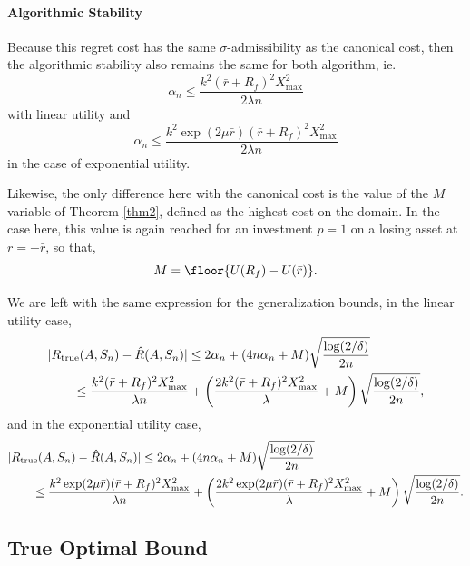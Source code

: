 \paragraph{Algorithmic Stability}
  Because this regret cost has the same $\sigma$-admissibility as the canonical cost, then
  the algorithmic stability also remains the same for both algorithm, ie.
  \begin{equation*}
    \alpha_n \leq \frac{k^2(\bar r+R_f)^2X^2_{\max}}{2\lambda n}
  \end{equation*}
  with linear utility and
  \begin{equation*}
    \alpha_n \leq \frac{k^2 \exp(2\mu\bar r)(\bar r + R_f)^2 X^2_{\max}}{2\lambda n}
  \end{equation*}
  in the case of exponential utility.


\begin{rem}
  Likewise, the only difference here with the canonical cost is the value of the $M$
  variable of Theorem \ref{thm2}, defined as the highest cost on the domain. In the case
  here, this value is again reached for an investment $p=1$ on a losing asset at $r=-\bar
  r$, so that,
  \begin{equation*}
    M = \floor{U(R_f) - U(\bar r)}.
  \end{equation*}

  We are left with the same expression for the generalization bounds, in the linear
  utility case,
  \begin{align*}
    &|R_{\mathrm{true}}(A,S_n) - \hat{R}(A,S_n)| \leq 2\alpha_n + (4n\alpha_n +
      M)\sqrt{\frac{\log(2/\delta)}{2n}}\\
    &\qquad \leq \frac{k^2(\bar r+R_f)^2X^2_{\max}}{\lambda n} + \left(\frac{2k^2(\bar r+R_f)^2X^2_{\max}}{\lambda} + M\right)\sqrt{\frac{\log(2/\delta)}{2n}},
  \end{align*}
  and in the exponential utility case, 
  \begin{align*}
    &|R_{\mathrm{true}}(A,S_n) - \hat{R}(A,S_n)| \leq 2\alpha_n + (4n\alpha_n +
      M)\sqrt{\frac{\log(2/\delta)}{2n}}\\
    &\qquad \leq \frac{k^2 \exp(2\mu\bar r)(\bar r + R_f)^2 X^2_{\max}}{\lambda n} + \left(\frac{2k^2 \exp(2\mu\bar r)(\bar r + R_f)^2 X^2_{\max}}{\lambda} + M\right)\sqrt{\frac{\log(2/\delta)}{2n}}.
  \end{align*}
\end{rem}

\subsection{True Optimal Bound}

